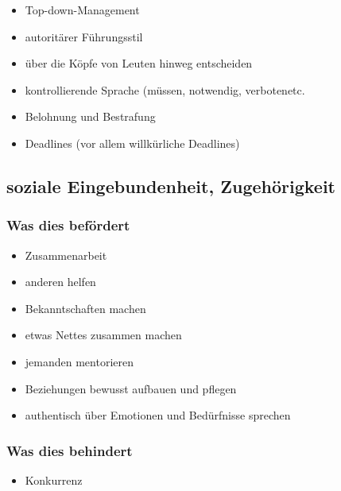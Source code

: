 \begin{itemize}
  \item Top-down-Management
  \item autoritärer Führungsstil 
  \item über die Köpfe von Leuten hinweg entscheiden
  \item kontrollierende Sprache (\glqq müssen\grqq, \glqq notwendig\grqq, \glqq verboten\grqq etc.
  \item Belohnung und Bestrafung
  \item Deadlines (vor allem willkürliche Deadlines) 
\end{itemize}



\subsection{soziale Eingebundenheit, Zugehörigkeit}


\subsubsection{Was dies befördert}

\begin{itemize}
  \item Zusammenarbeit
  \item anderen helfen
  \item Bekanntschaften machen
  \item etwas Nettes zusammen machen
  \item jemanden mentorieren
  \item Beziehungen bewusst aufbauen und pflegen
  \item authentisch über Emotionen und Bedürfnisse sprechen
\end{itemize}

\subsubsection{Was dies behindert}

\begin{itemize}
  \item Konkurrenz
\end{itemize}
